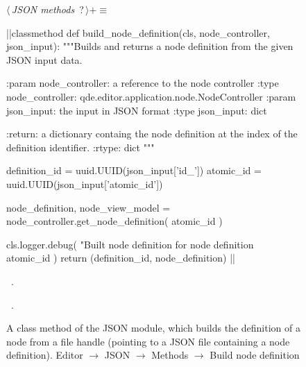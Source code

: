 \documentclass[%
    a4paper,    %
    justified,  %
    nobib,      %
    openany     %
]{tufte-book}
\begin{document}
\begin{figure}
\begin{flushleft} \small
\begin{minipage}{\linewidth}\label{scrap140}\raggedright\small
{} $\langle\,${\itshape JSON methods}\nobreak\ {\footnotesize {?}}$\,\rangle+\equiv$
\vspace{-1ex}
\begin{pythoncode}
|\normalfont{}\fontfamily{}|classmethod
def build_node_definition(cls, node_controller, json_input):
    """Builds and returns a node definition from the given JSON input data.

    :param node_controller: a reference to the node controller
    :type  node_controller: qde.editor.application.node.NodeController
    :param json_input: the input in JSON format
    :type  json_input: dict

    :return: a dictionary containg the node definition at the index of the
             definition identifier.
    :rtype:  dict
    """

    definition_id   = uuid.UUID(json_input['id_'])
    atomic_id       = uuid.UUID(json_input['atomic_id'])

    node_definition, node_view_model = node_controller.get_node_definition(
        atomic_id
    )

    cls.logger.debug(
        "Built node definition for node definition %
        atomic_id
    )
    return (definition_id, node_definition)
|\NWsep|
\end{pythoncode}
\vspace{1.5ex}
\footnotesize
\begin{list}{}{\setlength{\itemsep}{-\parsep}\setlength{\itemindent}{-\leftmargin}}
\item \NWtxtMacroDefBy\ .
\item \NWtxtMacroRefIn\ .

\item{}
\end{list}
\end{minipage}\vspace{4ex}
\end{flushleft}
\caption{A class method of the JSON module, which builds the definition of a node
  from a file handle (pointing to a JSON file containing a node
  definition).
  \newline{}\newline{}Editor $\rightarrow$ JSON $\rightarrow$
  Methods $\rightarrow$ Build node definition}
\label{editor:lst:json:methods:build-node-definition}
\end{figure}
\end{document}
